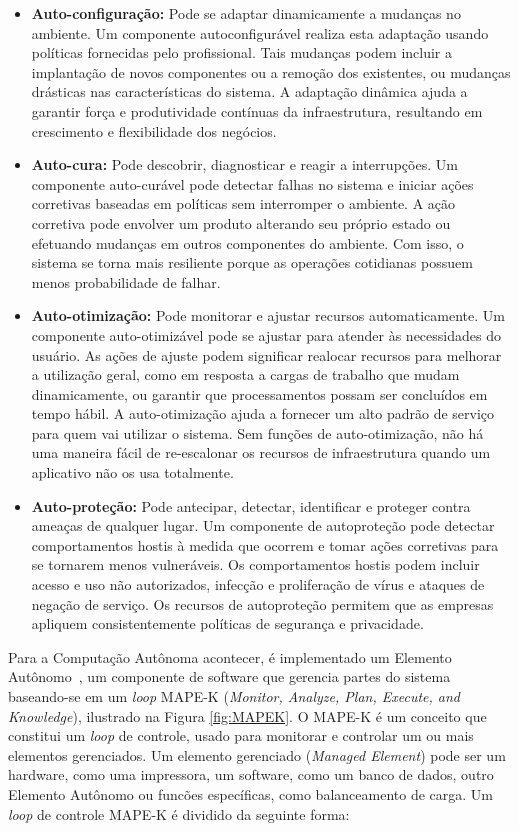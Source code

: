 \documentclass{article}
\begin{document}
\begin{itemize}
\item \textbf{Auto-configuração:} Pode se adaptar dinamicamente a mudanças no ambiente. Um componente autoconfigurável realiza esta adaptação usando políticas fornecidas pelo profissional. Tais mudanças podem incluir a implantação de novos componentes ou a remoção dos existentes, ou mudanças drásticas nas características do sistema. A adaptação dinâmica ajuda a garantir força e produtividade contínuas da infraestrutura, resultando em crescimento e flexibilidade dos negócios.
\item \textbf{Auto-cura:} Pode descobrir, diagnosticar e reagir a interrupções. Um componente auto-curável pode detectar falhas no sistema e iniciar ações corretivas baseadas em políticas sem interromper o ambiente. A ação corretiva pode envolver um produto alterando seu próprio estado ou efetuando mudanças em outros componentes do ambiente. Com isso, o sistema se torna mais resiliente porque as operações cotidianas possuem menos probabilidade de falhar.
\item \textbf{Auto-otimização:} Pode monitorar e ajustar recursos automaticamente. Um componente auto-otimizável pode se ajustar para atender às necessidades do usuário. As ações de ajuste podem significar realocar recursos para melhorar a utilização geral, como em resposta a cargas de trabalho que mudam dinamicamente, ou garantir que processamentos possam ser concluídos em tempo hábil. A auto-otimização ajuda a fornecer um alto padrão de serviço para quem vai utilizar o sistema. Sem funções de auto-otimização, não há uma maneira fácil de re-escalonar os recursos de infraestrutura quando um aplicativo não os usa totalmente.
\item \textbf{Auto-proteção:} Pode antecipar, detectar, identificar e proteger contra ameaças de qualquer lugar. Um componente de autoproteção pode detectar comportamentos hostis à medida que ocorrem e tomar ações corretivas para se tornarem menos vulneráveis. Os comportamentos hostis podem incluir acesso e uso não autorizados, infecção e proliferação de vírus e ataques de negação de serviço. Os recursos de autoproteção permitem que as empresas apliquem consistentemente políticas de segurança e privacidade.
\end{itemize}

Para a Computação Autônoma acontecer, é implementado um Elemento Autônomo~\citep{Abbas_2010}, um componente de software que gerencia partes do sistema baseando-se em um \textit{loop} MAPE-K (\textit{Monitor, Analyze, Plan, Execute, and Knowledge}), ilustrado na Figura \ref{fig:MAPEK}. O MAPE-K é um conceito que constitui um \textit{loop} de controle, usado para monitorar e controlar um ou mais elementos gerenciados. Um elemento gerenciado (\textit{Managed Element}) pode ser um hardware, como uma impressora, um software, como um banco de dados, outro Elemento Autônomo ou funcões específicas, como balanceamento de carga. Um \textit{loop} de controle MAPE-K é dividido da seguinte forma:
\end{document}
